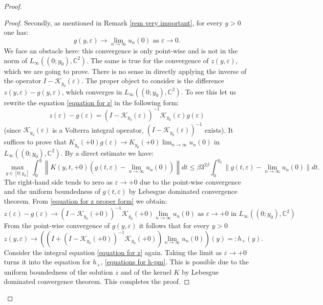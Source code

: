 \documentclass[a4paper,oneside,12pt]{amsart}
\begin{document}
\begin{proof}
\begin{proof}
Secondly, as mentioned in Remark \ref{rem very important}, for every $y>0$ one has:
\begin{equation*}
    g(y,\varepsilon)\rightarrow\lim_{n\rightarrow\infty}u_n(0)\text{ as }\varepsilon\rightarrow0.
\end{equation*}
We face an obstacle here: this convergence is only point-wise and is not in the norm of $L_{\infty}((0;y_0),\mathbb C^2)$. The same is true for the convergence of $z(y,\varepsilon)$, which we are going to prove. There is no sense in directly applying the inverse of the operator $I-\mathcal K_{y_0}(\varepsilon)$. The proper object to consider is the difference $z(y,\varepsilon)-g(y,\varepsilon)$, which converges in $L_{\infty}((0;y_0),\mathbb C^2)$. To see this let us rewrite the equation \eqref{equation for z} in the following form:
\begin{equation}\label{equation for z proper form}
    z(\varepsilon)-g(\varepsilon)=(I-\mathcal K_{y_0}(\varepsilon))^{-1}\mathcal K_{y_0}(\varepsilon)g(\varepsilon)
\end{equation}
(since $\mathcal K_{y_0}(\varepsilon)$ is a Volterra integral operator, $(I-\mathcal K_{y_0}(\varepsilon))^{-1}$ exists). It suffices to prove that $K_{y_0}(+0)g(\varepsilon)\rightarrow K_{y_0}(+0)\lim_{n\rightarrow\infty}u_n(0)$ in $L_{\infty}((0;y_0),\mathbb C^2)$. By a direct estimate we have:
\begin{equation*}
    \max_{y\in[0;y_0]}\int_0^y
    \left\|K(y,t,+0)\left(g(t,\varepsilon)-\lim_{n\rightarrow\infty}u_n(0)\right)\right\|dt
    \le
    \beta3^{2\beta}\int_0^{y_0}\|g(t,\varepsilon)-\lim_{n\rightarrow\infty}u_n(0)\|dt.
\end{equation*}
The right-hand side tends to zero as $\varepsilon\rightarrow+0$ due to the point-wise convergence and the uniform boundedness of $g(t,\varepsilon)$ by Lebesgue dominated convergence theorem. From \eqref{equation for z proper form} we obtain:
\begin{equation*}
    z(\varepsilon)-g(\varepsilon)\rightarrow(I-\mathcal K_{y_0}(+0))^{-1}\mathcal K_{y_0}(+0)\lim_{n\rightarrow\infty}u_n(0)\text{ as }\varepsilon\rightarrow+0\text{ in }L_{\infty}((0;y_0),\mathbb C^2)
\end{equation*}
From the point-wise convergence of $g(y,\varepsilon)$ it follows that for every $y>0$
\begin{equation*}
    z(y,\varepsilon)\rightarrow
    \left(\left(I+(I-\mathcal K_{y_0}(+0))^{-1}\mathcal K_{y_0}(+0)\right)\lim_{n\rightarrow\infty}u_n(0)\right)(y)=:h_+(y).
\end{equation*}
Consider the integral equation \eqref{equation for z} again. Taking the limit as $\varepsilon\rightarrow+0$ turns it into the equation for $h_+$, \eqref{equations for h-pm}. This is possible due to the uniform boundedness of the solution $z$ and of the kernel $K$ by Lebesgue dominated convergence theorem. This completes the proof.
\end{proof}


\end{proof}
\end{document}
